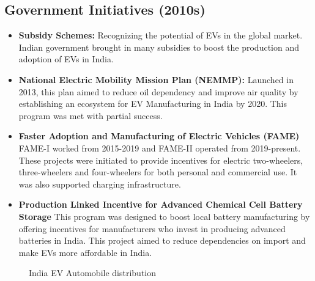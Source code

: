 \documentclass[a4paper,12pt]{report}
\begin{document}
\subsection{Government Initiatives (2010s)}
\begin{itemize}
    \item \textbf{Subsidy Schemes: } Recognizing the potential of EVs in the global market. Indian government brought in many subsidies to boost the production and adoption of EVs in India. 
    \item \textbf{National Electric Mobility Mission Plan (NEMMP):} 
    Launched in 2013, this plan aimed to reduce oil dependency and improve air quality by establishing an ecosystem for EV Manufacturing in India by 2020. This program was met with partial success. 
    \item \textbf{Faster Adoption and Manufacturing of Electric Vehicles (FAME)}
    FAME-I worked from 2015-2019 and FAME-II operated from 2019-present. These projects were initiated to provide incentives for electric two-wheelers, three-wheelers and four-wheelers for both personal and commercial use. It was also supported charging infrastructure. 
    \item \textbf{Production Linked Incentive for Advanced Chemical Cell Battery Storage}
    This program was designed to boost local battery manufacturing by offering incentives for manufacturers who invest in producing advanced batteries in India. This project aimed to reduce dependencies on import and make EVs more affordable in India.
\end{itemize}

\begin{figure}[h!]
    \centering
    \caption{India EV Automobile distribution}
\end{figure}
\end{document}
